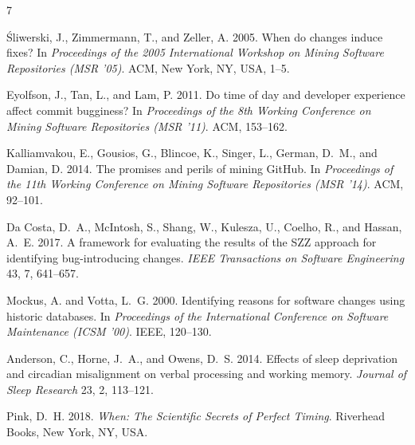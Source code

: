 \documentclass[sigconf]{acmart}
\begin{document}

\begin{thebibliography}{7}

Śliwerski, J., Zimmermann, T., and Zeller, A. 2005.
When do changes induce fixes?
In \textit{Proceedings of the 2005 International Workshop on Mining Software Repositories (MSR '05)}.
ACM, New York, NY, USA, 1--5.

Eyolfson, J., Tan, L., and Lam, P. 2011.
Do time of day and developer experience affect commit bugginess?
In \textit{Proceedings of the 8th Working Conference on Mining Software Repositories (MSR '11)}.
ACM, 153--162.

Kalliamvakou, E., Gousios, G., Blincoe, K., Singer, L., German, D.~M., and Damian, D. 2014.
The promises and perils of mining GitHub.
In \textit{Proceedings of the 11th Working Conference on Mining Software Repositories (MSR '14)}.
ACM, 92--101.

Da Costa, D.~A., McIntosh, S., Shang, W., Kulesza, U., Coelho, R., and Hassan, A.~E. 2017.
A framework for evaluating the results of the SZZ approach for identifying bug-introducing changes.
\textit{IEEE Transactions on Software Engineering} 43, 7, 641--657.

Mockus, A. and Votta, L.~G. 2000.
Identifying reasons for software changes using historic databases.
In \textit{Proceedings of the International Conference on Software Maintenance (ICSM '00)}.
IEEE, 120--130.

Anderson, C., Horne, J.~A., and Owens, D.~S. 2014.
Effects of sleep deprivation and circadian misalignment on verbal processing and working memory.
\textit{Journal of Sleep Research} 23, 2, 113--121.

Pink, D.~H. 2018.
\textit{When: The Scientific Secrets of Perfect Timing}.
Riverhead Books, New York, NY, USA.

\end{thebibliography}
\end{document}

